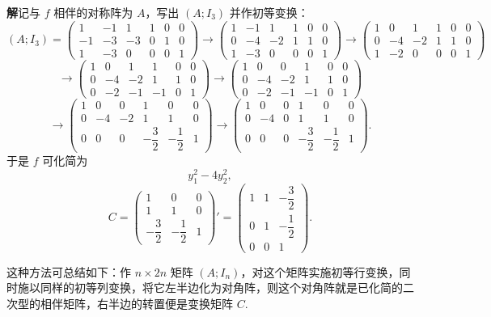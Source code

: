 \documentclass[UTF8,12pt,a4paper,fontset=fandol]{ctexart}
\begin{document}
\noindent\textbf{解}\quad 记与 $f$ 相伴的对称阵为 $A$，写出 $(A;I_3)$ 并作初等变换：
\[
(A;I_3)=
\left(\begin{array}{ccc|ccc}
1&-1&1&1&0&0\\
-1&-3&-3&0&1&0\\
1&-3&0&0&0&1
\end{array}\right)\rightarrow
\left(\begin{array}{ccc|ccc}
1&-1&1&1&0&0\\
0&-4&-2&1&1&0\\
1&-3&0&0&0&1
\end{array}\right)\rightarrow
\left(\begin{array}{ccc|ccc}
1&0&1&1&0&0\\
0&-4&-2&1&1&0\\
1&-2&0&0&0&1
\end{array}\right)
\]
\[
\rightarrow
\left(\begin{array}{ccc|ccc}
1&0&1&1&0&0\\
0&-4&-2&1&1&0\\
0&-2&-1&-1&0&1
\end{array}\right)\rightarrow
\left(\begin{array}{ccc|ccc}
1&0&0&1&0&0\\
0&-4&-2&1&1&0\\
0&-2&-1&-1&0&1
\end{array}\right)
\]
\[
\rightarrow
\left(\begin{array}{ccc|ccc}
1&0&0&1&0&0\\
0&-4&-2&1&1&0\\
0&0&0&-\dfrac32&-\dfrac12&1
\end{array}\right)\rightarrow
\left(\begin{array}{ccc|ccc}
1&0&0&1&0&0\\
0&-4&0&1&1&0\\
0&0&0&-\dfrac32&-\dfrac12&1
\end{array}\right).
\]
于是 $f$ 可化简为
\[
y_1^2-4y_2^2,
\]
\[
C=\left(\begin{array}{ccc}
1&0&0\\
1&1&0\\
-\dfrac32&-\dfrac12&1
\end{array}\right)'
=
\left(\begin{array}{ccc}
1&1&-\dfrac32\\
0&1&-\dfrac12\\
0&0&1
\end{array}\right).
\]

这种方法可总结如下：作 $n\times 2n$ 矩阵 $(A;I_n)$，对这个矩阵实施初等行变换，同时施以同样的初等列变换，将它左半边化为对角阵，则这个对角阵就是已化简的二次型的相伴矩阵，右半边的转置便是变换矩阵 $C$.
\end{document}
